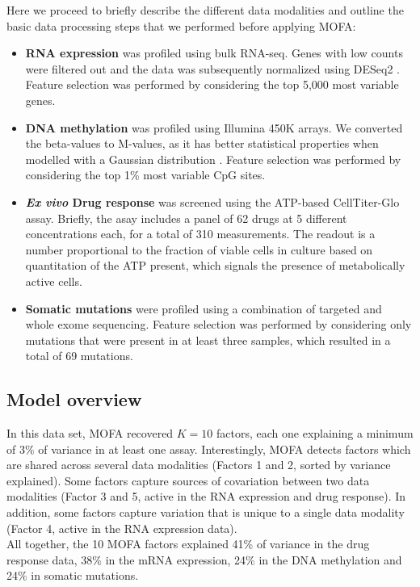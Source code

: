 Here we proceed to briefly describe the different data modalities and outline the basic data processing steps that we performed before applying MOFA:
\begin{itemize}
	\item \textbf{RNA expression} was profiled using bulk RNA-seq. Genes with low counts were filtered out and the data was subsequently normalized using DESeq2 \cite{Love2014}. Feature selection was performed by considering the top 5,000 most variable genes.
	\item \textbf{DNA methylation} was profiled using Illumina 450K arrays. We converted the beta-values to M-values, as it has better statistical properties when modelled with a Gaussian distribution \cite{Du2010}. Feature selection was performed by considering the top 1\% most variable CpG sites. 
	\item \textbf{\textit{Ex vivo} Drug response} was screened using the ATP-based CellTiter-Glo assay. Briefly, the asay includes a panel of 62 drugs at 5 different concentrations each, for a total of 310 measurements. The readout is a number proportional to the fraction of viable cells in culture based on quantitation of the ATP present, which signals the presence of metabolically active cells.
	\item \textbf{Somatic mutations} were profiled using a combination of targeted and whole exome sequencing. Feature selection was performed by considering only mutations that were present in at least three samples, which resulted in a total of 69 mutations.
\end{itemize}


\subsection{Model overview}

In this data set, MOFA recovered $K=10$ factors, each one explaining a minimum of 3\% of variance in at least one assay. Interestingly, MOFA detects factors which are shared across several data modalities (Factors 1 and 2, sorted by variance explained). Some factors capture sources of covariation between two data modalities (Factor 3 and 5, active in the RNA expression and drug response). In addition, some factors capture variation that is unique to a single data modality (Factor 4, active in the RNA expression data).\\
All together, the 10 MOFA factors explained 41\% of variance in the drug response data, 38\% in the mRNA expression, 24\% in the DNA methylation and 24\% in somatic mutations.

